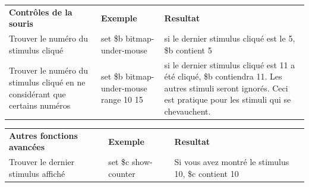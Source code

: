 \documentclass[
]{book}
\begin{document}
\begin{longtable}[]{@{}lll@{}}
\toprule
\endhead
\begin{minipage}[t]{0.34\columnwidth}\raggedright
\textbf{Contrôles de la souris}\strut
\end{minipage} & \begin{minipage}[t]{0.18\columnwidth}\raggedright
\textbf{Exemple}\strut
\end{minipage} & \begin{minipage}[t]{0.39\columnwidth}\raggedright
\textbf{Resultat}\strut
\end{minipage}\tabularnewline
\begin{minipage}[t]{0.34\columnwidth}\raggedright
Trouver le numéro du stimulus cliqué\strut
\end{minipage} & \begin{minipage}[t]{0.18\columnwidth}\raggedright
set \$b bitmap-under-mouse\strut
\end{minipage} & \begin{minipage}[t]{0.39\columnwidth}\raggedright
si le dernier stimulus cliqué est le 5, \$b contient 5\strut
\end{minipage}\tabularnewline
\begin{minipage}[t]{0.34\columnwidth}\raggedright
Trouver le numéro du stimulus cliqué en ne considérant que certains
numéros\strut
\end{minipage} & \begin{minipage}[t]{0.18\columnwidth}\raggedright
set \$b bitmap-under-mouse range 10 15\strut
\end{minipage} & \begin{minipage}[t]{0.39\columnwidth}\raggedright
si le dernier stimulus cliqué est 11 a été cliqué, \$b contiendra 11.
Les autres stimuli seront ignorés. Ceci est pratique pour les stimuli
qui se chevauchent.\strut
\end{minipage}\tabularnewline
\bottomrule
\end{longtable}

\begin{longtable}[]{@{}lll@{}}
\toprule
\endhead
\begin{minipage}[t]{0.30\columnwidth}\raggedright
\textbf{Autres fonctions avancées}\strut
\end{minipage} & \begin{minipage}[t]{0.19\columnwidth}\raggedright
\textbf{Exemple}\strut
\end{minipage} & \begin{minipage}[t]{0.42\columnwidth}\raggedright
\textbf{Resultat}\strut
\end{minipage}\tabularnewline
\begin{minipage}[t]{0.30\columnwidth}\raggedright
Trouver le dernier stimulus affiché\strut
\end{minipage} & \begin{minipage}[t]{0.19\columnwidth}\raggedright
set \$c show-counter\strut
\end{minipage} & \begin{minipage}[t]{0.42\columnwidth}\raggedright
Si vous avez montré le stimulus 10, \$c contient 10\strut
\end{minipage}\tabularnewline
\bottomrule
\end{longtable}
\end{document}
